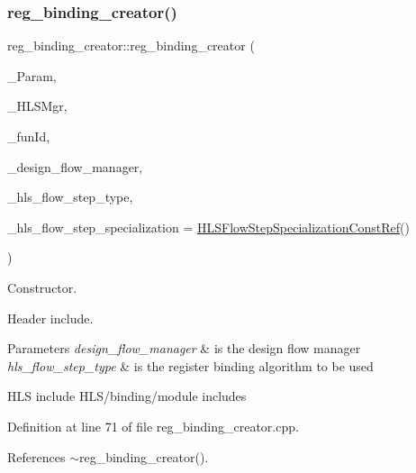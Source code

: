 \subsubsection{\texorpdfstring{reg\+\_\+binding\+\_\+creator()}{reg\_binding\_creator()}}
{\footnotesize\ttfamily reg\+\_\+binding\+\_\+creator\+::reg\+\_\+binding\+\_\+creator (\begin{DoxyParamCaption}\item[{const \hyperlink{Parameter_8hpp_a37841774a6fcb479b597fdf8955eb4ea}{Parameter\+Const\+Ref}}]{\+\_\+\+Param,  }\item[{const \hyperlink{hls__manager_8hpp_acd3842b8589fe52c08fc0b2fcc813bfe}{H\+L\+S\+\_\+manager\+Ref}}]{\+\_\+\+H\+L\+S\+Mgr,  }\item[{unsigned int}]{\+\_\+fun\+Id,  }\item[{const Design\+Flow\+Manager\+Const\+Ref}]{\+\_\+design\+\_\+flow\+\_\+manager,  }\item[{const \hyperlink{hls__step_8hpp_ada16bc22905016180e26fc7e39537f8d}{H\+L\+S\+Flow\+Step\+\_\+\+Type}}]{\+\_\+hls\+\_\+flow\+\_\+step\+\_\+type,  }\item[{const \hyperlink{hls__step_8hpp_a5fdd2edf290c196531d21d68e13f0e74}{H\+L\+S\+Flow\+Step\+Specialization\+Const\+Ref}}]{\+\_\+hls\+\_\+flow\+\_\+step\+\_\+specialization = {\ttfamily \hyperlink{hls__step_8hpp_a5fdd2edf290c196531d21d68e13f0e74}{H\+L\+S\+Flow\+Step\+Specialization\+Const\+Ref}()} }\end{DoxyParamCaption})}



Constructor. 

Header include.


\begin{DoxyParams}{Parameters}
{\em design\+\_\+flow\+\_\+manager} & is the design flow manager \\
\hline
{\em hls\+\_\+flow\+\_\+step\+\_\+type} & is the register binding algorithm to be used\\
\hline
\end{DoxyParams}
H\+LS include H\+L\+S/binding/module includes 

Definition at line 71 of file reg\+\_\+binding\+\_\+creator.\+cpp.



References $\sim$reg\+\_\+binding\+\_\+creator().

